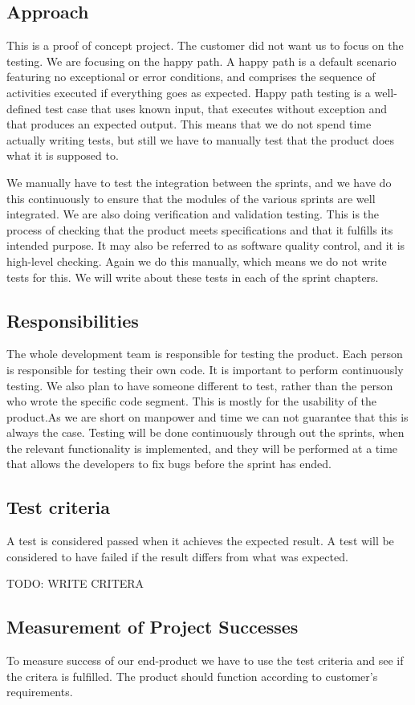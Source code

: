 \subsection{Approach}
This is a proof of concept project. The customer did not want us to focus on the testing. We are focusing on the happy path. A happy path is a default scenario featuring no exceptional or error conditions, and comprises the sequence of activities executed if everything goes as expected. Happy path testing is a well-defined test case that uses known input, that executes without exception and that produces an expected output. This means that we do not spend time actually writing tests, but still we have to manually test that the product does what it is supposed to.

We manually have to test the integration between the sprints, and we have do this continuously to ensure that the modules of the various sprints are well integrated. We are also doing verification and validation testing. This is the process of checking that the product meets specifications and that it fulfills its intended purpose. It may also be referred to as software quality control, and it is high-level checking. Again we do this manually, which means we do not write tests for this. We will write about these tests in each of the sprint chapters. 


\subsection{Responsibilities}
The whole development team is responsible for testing the product. 
Each person is responsible for testing their own code. It is important to perform continuously testing. We also plan to have someone different to test, rather than the person who wrote the specific code segment. 
This is mostly for the usability of the product.As we are short on manpower and time we can not guarantee that this is always the case.
Testing will be done continuously through out the sprints, when the relevant functionality is implemented, and they will be performed at a time that allows the developers to fix bugs before the sprint has ended. 

\subsection{Test criteria} 
A test is considered passed when it achieves the expected result.
A test will be considered to have failed if the result differs from what was expected.

TODO: WRITE CRITERA

\subsection{Measurement of Project Successes}
To measure success of our end-product we have to use the test criteria and see if the critera is fulfilled. The product should function according to customer's requirements.


